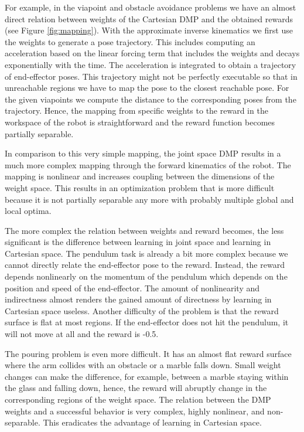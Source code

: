 \documentclass{article}
\begin{document}
For example, in the viapoint and obstacle avoidance problems we have an
almost direct relation between weights of the Cartesian DMP and the obtained
rewards (see Figure \ref{fig:mapping}).
With the approximate inverse kinematics we first use the weights to generate
a pose trajectory. This includes computing an acceleration based on the
linear forcing term that includes the weights and decays exponentially with
the time. The acceleration is integrated to obtain a trajectory of
end-effector poses. This trajectory might not be perfectly executable so that
in unreachable regions we have to map the pose to the closest reachable pose.
For the given viapoints we compute the distance to the corresponding poses
from the trajectory.
Hence, the mapping from specific weights to the reward in the workspace of
the robot is straightforward and the reward function becomes partially
separable.

In comparison to this very simple mapping, the joint space DMP results in a
much more complex mapping through the forward kinematics of the robot.
The mapping is nonlinear and increases coupling between the dimensions of
the weight space. This results in an optimization problem that is more
difficult because it is not partially separable any more with probably
multiple global and local optima.

The more complex the relation between weights and reward becomes, the
less significant is the difference between learning in joint space and
learning in Cartesian space.
The pendulum task is already a bit more complex because we cannot directly
relate the end-effector pose to the reward. Instead, the reward depends
nonlinearly on the momentum of the pendulum which depends on the position
and speed of the end-effector. The amount of nonlinearity and indirectness
almost renders the gained amount of directness by learning in Cartesian
space useless. Another difficulty of the problem is that the reward surface
is flat at most regions. If the end-effector does not hit the pendulum,
it will not move at all and the reward is -0.5.

The pouring problem is even more difficult. It has an almost flat reward
surface where the arm collides with an obstacle or a marble falls down.
Small weight changes can make the difference, for example, between a
marble staying within the glass and falling down, hence, the reward will
abruptly change in the corresponding regions of the weight space.
The relation between the DMP weights and a successful behavior is very
complex, highly nonlinear, and non-separable. This eradicates the
advantage of learning in Cartesian space.
\end{document}
